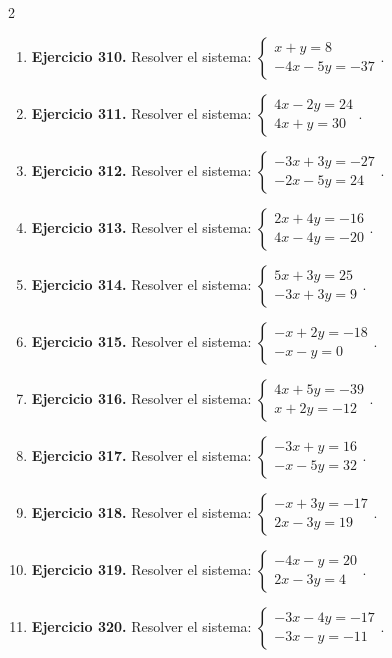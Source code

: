 \documentclass[10pt,a4paper]{article}
\begin{document}
\begin{multicols}{2}
\begin{enumerate}[label=\textbf{\arabic*.}]
\item \textbf{Ejercicio 310.} Resolver el sistema: \(\begin{cases}x + y=8\\- 4 x - 5 y=-37\end{cases}\).
\item \textbf{Ejercicio 311.} Resolver el sistema: \(\begin{cases}4 x - 2 y=24\\4 x + y=30\end{cases}\).
\item \textbf{Ejercicio 312.} Resolver el sistema: \(\begin{cases}- 3 x + 3 y=-27\\- 2 x - 5 y=24\end{cases}\).
\item \textbf{Ejercicio 313.} Resolver el sistema: \(\begin{cases}2 x + 4 y=-16\\4 x - 4 y=-20\end{cases}\).
\item \textbf{Ejercicio 314.} Resolver el sistema: \(\begin{cases}5 x + 3 y=25\\- 3 x + 3 y=9\end{cases}\).
\item \textbf{Ejercicio 315.} Resolver el sistema: \(\begin{cases}- x + 2 y=-18\\- x - y=0\end{cases}\).
\item \textbf{Ejercicio 316.} Resolver el sistema: \(\begin{cases}4 x + 5 y=-39\\x + 2 y=-12\end{cases}\).
\item \textbf{Ejercicio 317.} Resolver el sistema: \(\begin{cases}- 3 x + y=16\\- x - 5 y=32\end{cases}\).
\item \textbf{Ejercicio 318.} Resolver el sistema: \(\begin{cases}- x + 3 y=-17\\2 x - 3 y=19\end{cases}\).
\item \textbf{Ejercicio 319.} Resolver el sistema: \(\begin{cases}- 4 x - y=20\\2 x - 3 y=4\end{cases}\).
\item \textbf{Ejercicio 320.} Resolver el sistema: \(\begin{cases}- 3 x - 4 y=-17\\- 3 x - y=-11\end{cases}\).
\end{enumerate}
\end{multicols}
\end{document}
